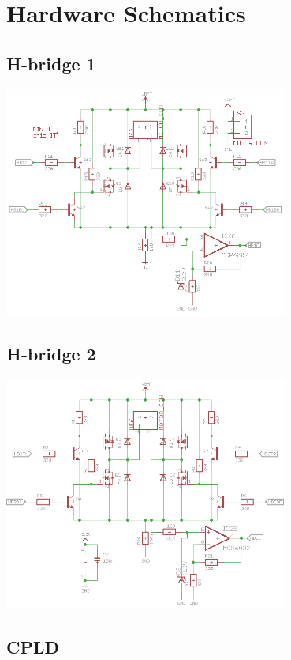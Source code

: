 \section{Hardware Schematics}

\subsection{H-bridge 1}
\includegraphics[width=0.7\textwidth]{figures/HB1.PNG}
\subsection{H-bridge 2}
\includegraphics[width=0.7\textwidth]{figures/HB2.PNG}

\subsection{CPLD}

